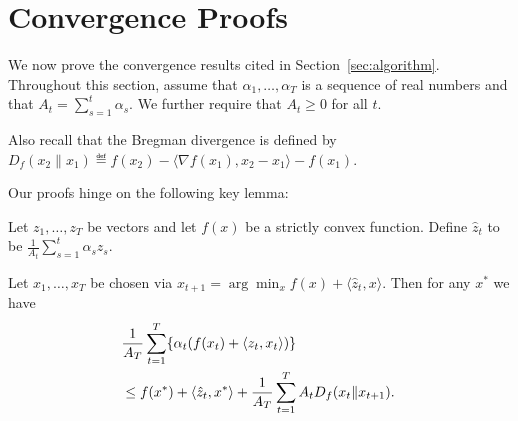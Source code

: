 \documentclass{article}
\begin{document}
\section{Convergence Proofs}
\label{sec:proofs}
We now prove the convergence results cited in Section~\ref{sec:algorithm}. 
Throughout this section, assume that $\alpha_1,\ldots,\alpha_T$ is 
a sequence of real numbers and that $A_t = \sum_{s=1}^t \alpha_s$. 
We further require that $A_t \geq 0$ for all $t$.

Also recall that the Bregman divergence is defined by 
$D_f(x_2 \| x_1) \eqdef f(x_2) - \langle \nabla f(x_1), x_2-x_1 \rangle - f(x_1)$.

Our proofs hinge on the following key lemma:
\begin{lemma}
\label{lem:bregman}
Let $z_1,\ldots,z_T$ be vectors and let $f(x)$ be a strictly convex 
function. Define $\hat{z}_t$ to be $\frac{1}{A_t} \sum_{s=1}^t \alpha_s z_s$.

Let $x_1,\ldots,x_T$ be chosen via $x_{t+1} = \arg\min_{x} f(x) + \langle \hat{z}_t, x\rangle$. 
Then for any $x^*$ we have
\begin{align*}
\lefteqn{\frac{1}{A_T} \sum_{t=1}^T \{\alpha_t(f(x_t) + \langle z_t, x_t \rangle)\}} \\
\phantom{+} &\leq f(x^*) + \langle \hat{z}_t, x^* \rangle + \frac{1}{A_T} \sum_{t=1}^T A_t D_{f}(x_t \| x_{t+1}). 
\end{align*}
\end{lemma}
\end{document}
